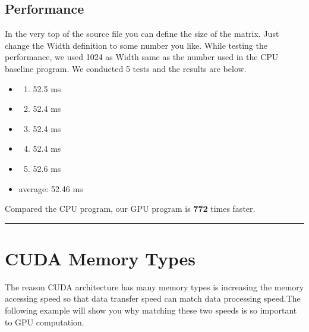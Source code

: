 \documentclass[letterpaper,10pt,english]{sphinxmanual}
\begin{document}
\subsection{Performance}
\label{CUDA2D/CUDA2D:id1}
In the very top of the source file you can define the size of the matrix. Just change the Width definition to some number you like. While testing the performance, we used 1024 as Width same as the number used in the CPU baseline program. We conducted 5 tests and the results are below.
\begin{itemize}
\item {} \begin{enumerate}
\item {} 
52.5 ms

\end{enumerate}

\item {} \begin{enumerate}
\setcounter{enumi}{1}
\item {} 
52.4 ms

\end{enumerate}

\item {} \begin{enumerate}
\setcounter{enumi}{2}
\item {} 
52.4 ms

\end{enumerate}

\item {} \begin{enumerate}
\setcounter{enumi}{3}
\item {} 
52.4 ms

\end{enumerate}

\item {} \begin{enumerate}
\setcounter{enumi}{4}
\item {} 
52.6 ms

\end{enumerate}

\item {} 
average: 52.46 ms

\end{itemize}

Compared the CPU program, our GPU program is \textbf{772} times faster.


\bigskip\hrule{}\bigskip



\section{CUDA Memory Types}
\label{CUDA2D/CUDA2D:cuda-memory-types}
The reason CUDA architecture has many memory types is increasing the memory accessing speed so that data transfer speed can match data processing speed.The following example will show you why matching these two speeds is so important to GPU computation.
\end{document}
